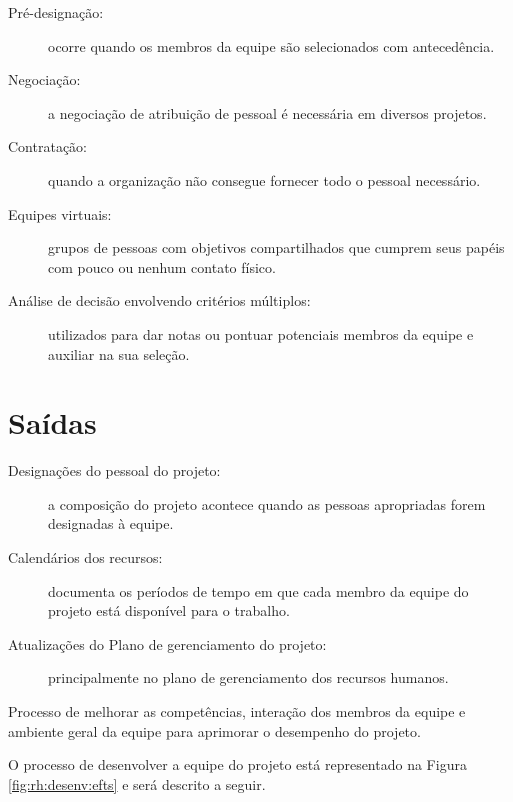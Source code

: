 \begin{description}
	
	\item[Pré-designação:] ocorre quando os membros da equipe são selecionados com antecedência.
	
	\item[Negociação:] a negociação de atribuição de pessoal é necessária em diversos projetos.
	
	\item[Contratação:] quando a organização não consegue fornecer todo o pessoal necessário.
	
	\item[Equipes virtuais:] grupos de pessoas com objetivos compartilhados que cumprem seus papéis com pouco ou nenhum contato físico.
	
	\item[Análise de decisão envolvendo critérios múltiplos:] utilizados para dar notas ou pontuar potenciais membros da equipe e auxiliar na sua seleção.
	
\end{description}

\section{Saídas}

\begin{description}

	\item[Designações do pessoal do projeto:] a composição do projeto acontece quando as pessoas apropriadas forem designadas à equipe.
	
	\item[Calendários dos recursos:] documenta os períodos de tempo em que cada membro da equipe do projeto está disponível para o trabalho.
	
	\item[Atualizações do Plano de gerenciamento do projeto:] principalmente no plano de gerenciamento dos recursos humanos.
	
\end{description}


Processo de melhorar as competências, interação dos membros da equipe e ambiente geral da equipe para aprimorar o desempenho do projeto.

O processo de desenvolver a equipe do projeto está representado na Figura \ref{fig:rh:desenv:efts} e será descrito a seguir.

